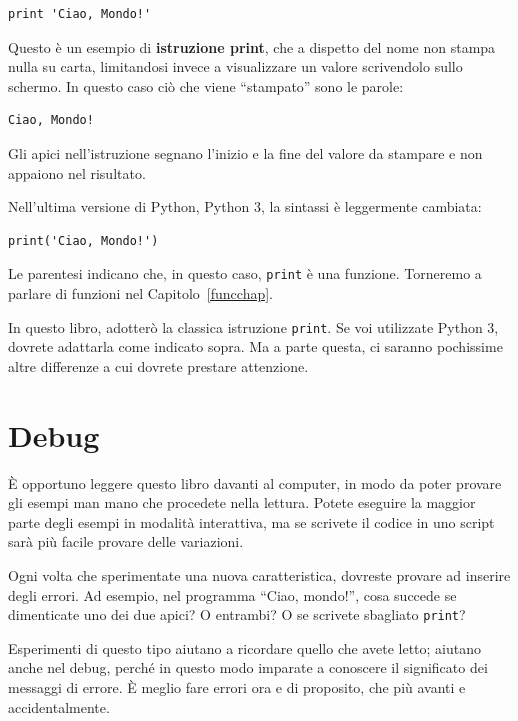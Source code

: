 \documentclass[10pt]{book}
\begin{document}
\begin{verbatim}
print 'Ciao, Mondo!'
\end{verbatim}
%
Questo è un esempio di {\bf istruzione print}, che a dispetto del nome non stampa
nulla su carta, limitandosi invece a visualizzare un valore scrivendolo sullo schermo. In questo caso ciò che viene ``stampato'' sono le parole:

\begin{verbatim}
Ciao, Mondo!
\end{verbatim}
%
Gli apici nell'istruzione segnano l'inizio e la fine del valore da stampare e non appaiono nel risultato.

Nell'ultima versione di Python, Python 3, la sintassi è leggermente cambiata:

\begin{verbatim}
print('Ciao, Mondo!')
\end{verbatim}
%
Le parentesi indicano che, in questo caso, {\tt print} è una funzione. Torneremo a parlare di funzioni nel Capitolo~\ref{funcchap}.
  

In questo libro, adotterò la classica istruzione {\tt print}. Se voi utilizzate Python 3, dovrete adattarla come indicato sopra. Ma a parte questa, ci saranno pochissime altre differenze a cui dovrete prestare attenzione.


\section{Debug}

È opportuno leggere questo libro davanti al computer, in modo da poter provare gli esempi man mano che procedete nella lettura. Potete eseguire la maggior parte degli esempi in modalità interattiva, ma se scrivete il codice in uno script sarà più facile provare delle variazioni.

Ogni volta che sperimentate una nuova caratteristica, dovreste provare ad inserire degli errori. Ad esempio, nel programma ``Ciao, mondo!'', cosa succede se dimenticate uno dei due apici? O entrambi? O se scrivete sbagliato {\tt print}?

Esperimenti di questo tipo aiutano a ricordare quello che avete letto; aiutano anche nel debug, perché in questo modo imparate a conoscere il significato dei messaggi di errore. È meglio fare errori ora e di proposito, che più avanti e accidentalmente.
\end{document}
